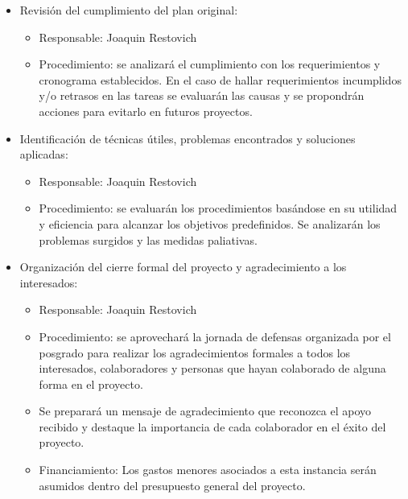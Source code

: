\documentclass[
11pt, %
]{charter}
\begin{document}
\begin{itemize}
	\item Revisión del cumplimiento del plan original: 
	\begin{itemize}
		\item Responsable: Joaquin Restovich
		\item Procedimiento: se analizará el cumplimiento con los requerimientos y cronograma
establecidos. En el caso de hallar requerimientos incumplidos y/o retrasos en las
tareas se evaluarán las causas y se propondrán acciones para evitarlo en futuros
proyectos.
	\end{itemize}

	\item Identificación de técnicas útiles, problemas encontrados y soluciones aplicadas:
	\begin{itemize}
		\item Responsable: Joaquin Restovich
		\item Procedimiento: se evaluarán los procedimientos basándose en su utilidad
y eficiencia para alcanzar los objetivos predefinidos. Se analizarán los problemas
surgidos y las medidas paliativas.
	\end{itemize}
	
	\item Organización del cierre formal del proyecto y agradecimiento a los interesados: 
	\begin{itemize}
		\item Responsable: Joaquin Restovich
		\item Procedimiento: se aprovechará la jornada de defensas organizada por el posgrado para realizar los agradecimientos formales a todos los interesados, colaboradores y personas que hayan
colaborado de alguna forma en el proyecto.
		\item Se preparará un mensaje de agradecimiento que reconozca el apoyo recibido y
destaque la importancia de cada colaborador en el éxito del proyecto.
		\item Financiamiento: Los gastos menores asociados a esta instancia serán asumidos dentro del presupuesto general del proyecto.
	\end{itemize}
\end{itemize}
\end{document}
